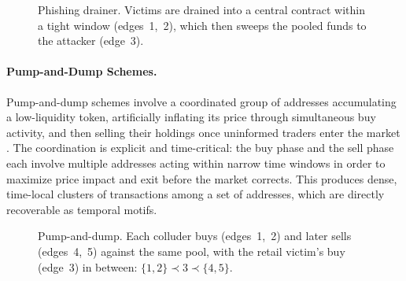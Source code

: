 \documentclass{thesisclass}
\begin{document}
\begin{figure}[ht]
  \centering
  \caption[Phishing temporal motif]{Phishing drainer. Victims are drained into a
    central contract within a tight window (edges~1,~2), which then sweeps the
    pooled funds to the attacker (edge~3).}
  \label{fig:motif-phishing}
\end{figure}

\paragraph{Pump-and-Dump Schemes.}
Pump-and-dump schemes involve a coordinated group of addresses accumulating a low-liquidity token, artificially inflating its price through simultaneous buy activity, and then selling their holdings once uninformed traders enter the market \citep{li2021cryptocurrency, hornuf2025cybercrime}. The coordination is explicit and time-critical: the buy phase and the sell phase each involve multiple addresses acting within narrow time windows in order to maximize price impact and exit before the market corrects. This produces dense, time-local clusters of transactions among a set of addresses, which are directly recoverable as temporal motifs.

\begin{figure}[ht]
  \centering
  \caption[Pump-and-dump temporal motif]{Pump-and-dump. Each colluder buys
    (edges~1,~2) and later sells (edges~4,~5) against the same pool, with the
    retail victim's buy (edge~3) in between: $\{1,2\} \prec 3 \prec \{4,5\}$.}
  \label{fig:motif-pumpdump}
\end{figure}
\end{document}
